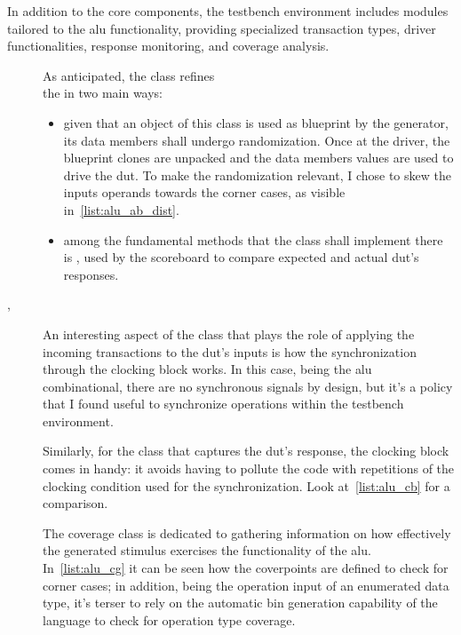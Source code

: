 In addition to the core components, the testbench environment includes modules tailored to the \ac{alu} functionality, providing specialized transaction types, driver functionalities, response monitoring, and coverage analysis.
\begin{description}
    \item[] As anticipated, the class refines\\ the  in two main ways:
    \begin{itemize}
        \item given that an object of this class is used as blueprint by the generator, its data members shall undergo randomization. Once at the driver, the blueprint clones are unpacked and the data members values are used to drive the \ac{dut}. To make the randomization relevant, I chose to skew the inputs operands towards the corner cases, as visible in~\cref{list:alu_ab_dist}.
        \item among the fundamental methods that the class shall implement there is , used by the scoreboard to compare expected and actual \ac{dut}'s responses.
    \end{itemize}
    
    \item[, ]
    An interesting aspect of the class that plays the role of applying the incoming transactions to the \ac{dut}'s inputs is how the synchronization through the clocking block works. In this case, being the \ac{alu} combinational, there are no synchronous signals by design, but it's a policy that I found useful to synchronize operations within the testbench environment. 

    Similarly, for the class that captures the \ac{dut}'s response, the clocking block comes in handy: it avoids having to pollute the code with repetitions of the clocking condition used for the synchronization. Look at~\cref{list:alu_cb} for a comparison.
    
    \item[] The coverage class is dedicated to gathering information on how effectively the generated stimulus exercises the functionality of the \ac{alu}. In~\cref{list:alu_cg} it can be seen how the coverpoints are defined to check for corner cases; in addition, being the operation input of an enumerated data type, it's terser to rely on the automatic bin generation capability of the language to check for operation type coverage.
    

\end{description}
